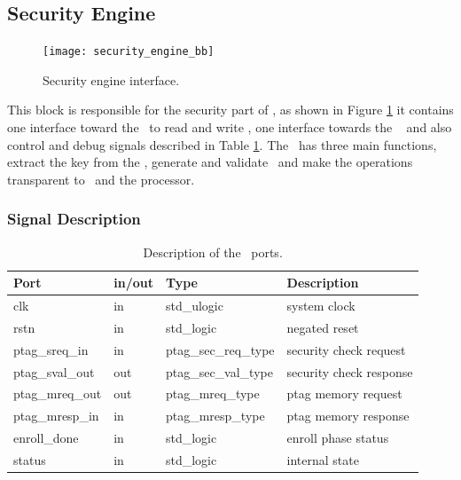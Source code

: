 \subsection{Security Engine}
\label{sec:secengine}

\begin{figure}[!ht]
    \centering
    \texttt{[image: security\_engine\_bb]}
    \caption{Security engine interface.  }
    \label{fig:sebb}
\end{figure}


This block is responsible for the security part of \cshia,  as shown in Figure \ref{fig:sebb} it contains one interface toward the \ptagmem~to read and write \ptags, one interface towards the \handler~ and also control and debug signals described in Table \ref{table:seports}.  The \seceng~has three main functions, extract the key from the \puf, generate and validate \ptags~and make the \ptagmem operations transparent to \handler~and the processor.



\subsubsection{Signal Description}
\begin{table}[H]
    \centering
    \begin{tabular}{l l l l}
    
        \textbf{Port}   & \textbf{in/out} & \textbf{Type}        & \textbf{Description} 	\\ \hline \hline
        clk             & in              & std\_ulogic          & system clock         	\\ \hline
        rstn            & in              & std\_logic           & negated reset         	\\ \hline
        ptag\_sreq\_in  & in              & ptag\_sec\_req\_type & security check request    	\\ \hline
        ptag\_sval\_out & out             & ptag\_sec\_val\_type & security check response  	\\ \hline
        ptag\_mreq\_out & out             & ptag\_mreq\_type 	 & ptag memory  request    	\\ \hline
        ptag\_mresp\_in & in              & ptag\_mresp\_type 	 & ptag memory  response  	\\ \hline
        enroll\_done    & in              &  std\_logic      	 & enroll phase status  	\\ \hline
        status          & in              &  std\_logic      	 & internal state 	\\ \hline
        
    \end{tabular}
    \caption{Description of the \seceng~ports.}
    \label{table:seports}
\end{table}




